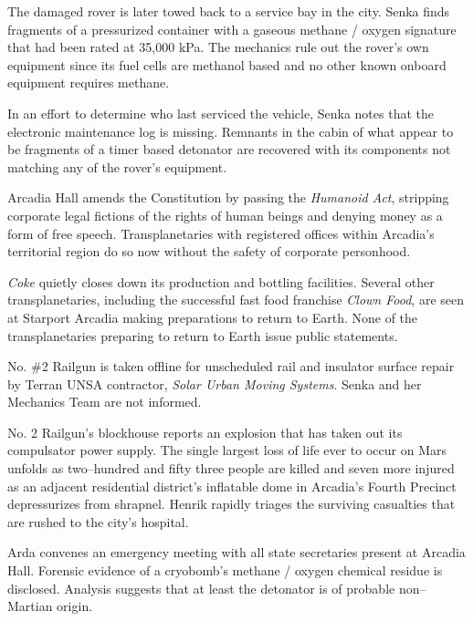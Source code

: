The damaged rover is later towed back to a service bay in the city. Senka finds fragments of a pressurized container with a gaseous methane / oxygen signature that had been rated at 35,000 kPa. The mechanics rule out the rover's own equipment since its fuel cells are methanol based and no other known onboard equipment requires methane. 

In an effort to determine who last serviced the vehicle, Senka notes that the electronic maintenance log is missing. Remnants in the cabin of what appear to be fragments of a timer based detonator are recovered with its components not matching any of the rover's equipment.
\StopTimelineDate

Arcadia Hall amends the Constitution by passing the {\it Humanoid Act}, stripping corporate legal fictions of the rights of human beings and denying money as a form of free speech. Transplanetaries with registered offices within Arcadia's territorial region do so now without the safety of corporate personhood.
\StopTimelineDate

{\it Coke} quietly closes down its production and bottling facilities. Several other transplanetaries, including the successful fast food franchise {\it Clown Food}, are seen at Starport Arcadia making preparations to return to Earth. None of the transplanetaries preparing to return to Earth issue public statements.
\StopTimelineDate

No. \#2 Railgun is taken offline for unscheduled rail and insulator surface repair by Terran UNSA contractor, {\it Solar Urban Moving Systems}. Senka and her Mechanics Team are not informed.
\StopTimelineDate

No. \type{#}2 Railgun's blockhouse reports an explosion that has taken out its compulsator power supply. The single largest loss of life ever to occur on Mars unfolds as two--hundred and fifty three people are killed and seven more injured as an adjacent residential district's inflatable dome in Arcadia's Fourth Precinct depressurizes from shrapnel. Henrik rapidly triages the surviving casualties that are rushed to the city's hospital.

Arda convenes an emergency meeting with all state secretaries present at Arcadia Hall. Forensic evidence of a cryobomb's methane / oxygen chemical residue is disclosed. Analysis suggests that at least the detonator is of probable non--Martian origin. 


